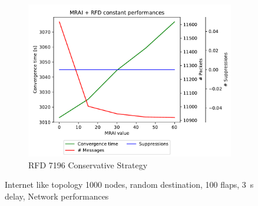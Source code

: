 \begin{figure}[h]
\begin{subfigure}[b]{0.325\textwidth}
         \label{fig:1000_7196RFDA_multiMRAI_mice}
     \end{subfigure}
     \hfill
     \begin{subfigure}[b]{0.325\textwidth}
         \centering
         \includegraphics[width=\textwidth]{images/RFD/miceVSelephants/MultiMRAI/mice/cisco_1000_RFD_7196_conservative-constant_mrai_rfd_evolution.pdf}
         \caption{RFD 7196 Conservative Strategy}
         \label{fig:1000_7196RFDC_multiMRAI_mice}
     \end{subfigure}
		\caption{Internet like topology \num{1000} nodes, random destination, \num{100} flaps, \SI{3}{\second} delay, Network performances}
        \label{fig:1000_RFD_multiMRAI_mice}
\end{figure}


